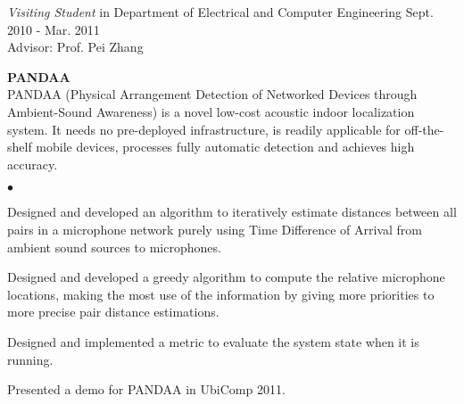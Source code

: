 \documentclass[margin,line]{res}
\newenvironment{list1}{
  \begin{list}{\ding{113}}{
      \setlength{\itemsep}{0in}
      \setlength{\parsep}{0in} \setlength{\parskip}{0in}
      \setlength{\topsep}{0in} \setlength{\partopsep}{0in}
      \setlength{\leftmargin}{0.17in}}}{\end{list}}
\newenvironment{list2}{
  \begin{list}{$\bullet$}{
      \setlength{\itemsep}{0in}
      \setlength{\parsep}{0in} \setlength{\parskip}{0in}
      \setlength{\topsep}{0in} \setlength{\partopsep}{0in}
      \setlength{\leftmargin}{0.2in}}}{\end{list}}
\begin{document}
\begin{resume}
      \vspace{-.3cm}
      {\em Visiting Student} in Department of Electrical and Computer Engineering \hfill Sept. 2010 - Mar. 2011\\
      Advisor: Prof. Pei Zhang\\
      \vspace*{-.1in}
      \begin{list1}
        \item[] {\bf PANDAA}\\
        PANDAA (Physical Arrangement Detection of Networked Devices through Ambient-Sound Awareness) is a novel low-cost acoustic indoor localization system. It needs no pre-deployed infrastructure, is readily applicable for off-the-shelf  mobile devices, processes fully automatic detection and achieves high accuracy.
        \vspace*{.05in}
        \begin{list2}
          \item Designed and developed an algorithm to iteratively estimate distances between all pairs in a microphone network purely using Time Difference of Arrival from ambient sound sources to microphones.
          \item Designed and developed a greedy algorithm to compute the relative microphone locations, making the most use of the information by giving more priorities to more precise pair distance estimations.
          \item Designed and implemented a metric to evaluate the system state when it is running.
          \item Presented a demo for PANDAA in UbiComp 2011.
        \end{list2}



\end{list1}
\end{resume}
\end{document}
